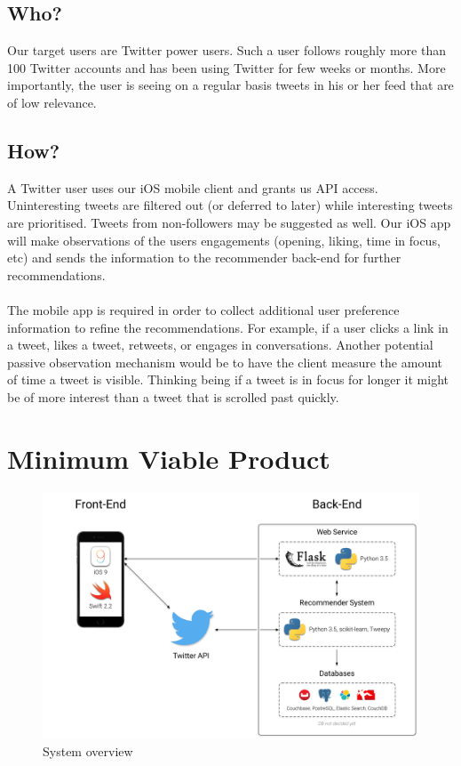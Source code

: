 \documentclass{article}
\begin{document}
\subsection{Who?}
Our target users are Twitter power users. Such a user follows roughly more than 100 Twitter accounts and has been using Twitter for few weeks or months. More importantly, the user is seeing on a regular basis tweets in his or her feed that are of low relevance.

\subsection{How?}
A Twitter user uses our iOS mobile client and grants us API access. Uninteresting tweets are filtered out (or deferred to later) while interesting tweets are prioritised. Tweets from non-followers may be suggested as well. Our iOS app will make observations of the users engagements (opening, liking, time in focus, etc) and sends the information to the recommender back-end for further recommendations.
\\\\
The mobile app is required in order to collect additional user preference information to refine the recommendations. For example, if a user clicks a link in a tweet, likes a tweet, retweets, or engages in conversations. Another potential passive observation mechanism would be to have the client measure the amount of time a tweet is visible. Thinking being if a tweet is in focus for longer it might be of more interest than a tweet that is scrolled past quickly.



\section{Minimum Viable Product}

\begin{figure}[H]
    \centering
    \includegraphics[width=\textwidth]{system_overview}  
    \caption{System overview}
\end{figure}
\end{document}
